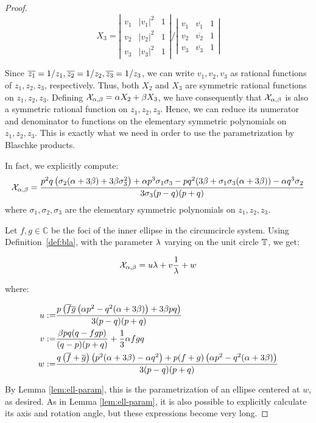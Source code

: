 \begin{proof}
\[
    X_3=\left|
        \begin{array}{ccc}
          v_1 & |v_1|^2 & 1 \\
          v_2 & |v_2|^2 & 1 \\
          v_3 & |v_3|^2 & 1
        \end{array}
      \right| \Bigg/
     \left|
        \begin{array}{ccc}
          v_1 & \overline{v_1} & 1 \\
          v_2 & \overline{v_2} & 1 \\
          v_3 & \overline{v_3} & 1
        \end{array}
      \right|
\]

Since $\overline{z_1}=1/z_1,\overline{z_2}=1/z_2,\overline{z_3}=1/z_3$, we can write $v_1,v_2,v_3$ as rational functions of $z_1,z_2,z_3$, respectively. Thus, both $X_2$ and $X_3$ are symmetric rational functions on $z_1,z_2,z_3$. Defining $\mathcal{X}_{\alpha,\beta}=\alpha X_2+\beta X_3$, we have consequently that $\mathcal{X}_{\alpha,\beta}$ is also a symmetric rational function on $z_1,z_2,z_3$. Hence, we can reduce its numerator and denominator to functions on the elementary symmetric polynomials on $z_1,z_2,z_3$. This is exactly what we need in order to use the parametrization by Blaschke products.

In fact, we explicitly compute:
\[  \mathcal{X}_{\alpha,\beta}= \frac{p^2 q \left(\sigma_2 (\alpha +3 \beta )+3 \beta  \sigma_3^2\right)+\alpha  p^3 \sigma_1 \sigma_3-p q^2 (3 \beta +\sigma_1 \sigma_3 (\alpha +3 \beta ))-\alpha  q^3 \sigma_2}{3 \sigma_3 (p-q) (p+q)}\]
where $\sigma_1,\sigma_2,\sigma_3$ are the elementary symmetric polynomials on $z_1,z_2,z_3$.

Let $f,g\in\mathbb{C}$ be the foci of the inner ellipse in the circumcircle system. Using Definition~\ref{def:bla}, with the parameter $\lambda$ varying on the unit circle $\mathbb{T}$, we get:

\begin{equation}
\mathcal{X}_{\alpha,\beta}= u \lambda+v\frac{1}{\lambda}+w
\label{eqn:xi-param}
\end{equation}

\noindent where:

\begin{align*}
    u:=&\frac{p \left(\overline{f} \overline{g} \left(\alpha  p^2-q^2 (\alpha +3 \beta )\right)+3 \beta  p q\right)}{3 (p-q) (p+q)}\\
    v:=&\frac{\beta  p q (q-f g p)}{(q-p) (p+q)}+\frac{1}{3} \alpha  f g q\\
    w:=&\frac{q \left(\overline{f}+\overline{g}\right) \left(p^2 (\alpha +3 \beta )-\alpha  q^2\right)+p (f+g) \left(\alpha  p^2-q^2 (\alpha +3 \beta )\right)}{3 (p-q) (p+q)}
\end{align*}

By Lemma \ref{lem:ell-param}, this is the parametrization of an ellipse centered at $w$, as desired. As in Lemma \ref{lem:ell-param}, it is also possible to explicitly calculate its axis and rotation angle, but these expressions become very long.

\end{proof}


